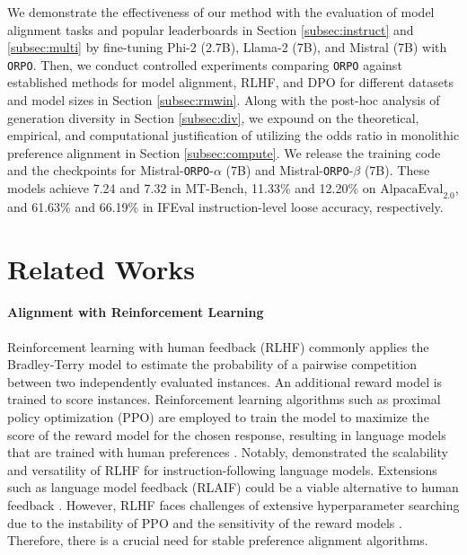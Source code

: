 We demonstrate the effectiveness of our method with the evaluation of model alignment tasks and popular leaderboards in Section \ref{subsec:instruct} and \ref{subsec:multi} by fine-tuning Phi-2 (2.7B), Llama-2 (7B), and Mistral (7B) with \texttt{ORPO}. Then, we conduct controlled experiments comparing \texttt{ORPO} against established methods for model alignment, RLHF, and DPO for different datasets and model sizes in Section \ref{subsec:rmwin}. Along with the post-hoc analysis of generation diversity in Section \ref{subsec:div}, we expound on the theoretical, empirical, and computational justification of utilizing the odds ratio in monolithic preference alignment in Section \ref{subsec:compute}. We release the training code and the checkpoints for Mistral-\texttt{ORPO}-$\alpha$ (7B) and Mistral-\texttt{ORPO}-$\beta$ (7B). These models achieve 7.24 and 7.32 in MT-Bench, 11.33\% and 12.20\% on $\text{AlpacaEval}_{2.0}$, and 61.63\% and 66.19\% in IFEval instruction-level loose accuracy, respectively. %

\section{Related Works}
\paragraph{Alignment with Reinforcement Learning} Reinforcement learning with human feedback (RLHF) commonly applies the Bradley-Terry model \citep{19ff28b9-64f9-3656-ba40-08326a05748e} to estimate the probability of a pairwise competition between two independently evaluated instances. An additional reward model is trained to score instances. Reinforcement learning algorithms such as proximal policy optimization (PPO) \citep{schulman2017proximal} are employed to train the model to maximize the score of the reward model for the chosen response, resulting in language models that are trained with human preferences \citep{ziegler2020finetuning, stiennon2022learning}. Notably, \citet{ouyang2022training} demonstrated the scalability and versatility of RLHF for instruction-following language models. Extensions such as language model feedback (RLAIF) could be a viable alternative to human feedback \citep{bai2022constitutional, lee2023rlaif, pang2023language}. However, RLHF faces challenges of extensive hyperparameter searching due to the instability of PPO \citep{rafailov2023direct, wu2023pairwise} and the sensitivity of the reward models \citep{gao2022scaling, wang2024secrets}. Therefore, there is a crucial need for stable preference alignment algorithms.

